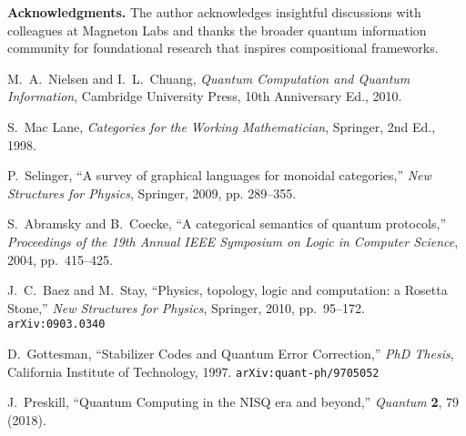 \documentclass[12pt]{article}
\begin{document}
\vspace{1cm}

\noindent \textbf{Acknowledgments.} 
The author acknowledges insightful discussions with colleagues at Magneton Labs and thanks the broader quantum information community for foundational research that inspires compositional frameworks.

\vspace{0.5cm}

\begin{thebibliography}{99}

M.~A.~Nielsen and I.~L.~Chuang, 
\textit{Quantum Computation and Quantum Information}, 
Cambridge University Press, 10th Anniversary Ed., 2010.

S.~Mac Lane, 
\textit{Categories for the Working Mathematician}, 
Springer, 2nd Ed., 1998.

P.~Selinger, 
``A survey of graphical languages for monoidal categories,''
\textit{New Structures for Physics}, Springer, 2009, pp. 289--355.

S.~Abramsky and B.~Coecke, 
``A categorical semantics of quantum protocols,''
\textit{Proceedings of the 19th Annual IEEE Symposium on Logic in Computer Science}, 2004, pp.~415--425.

J.~C.~Baez and M.~Stay, 
``Physics, topology, logic and computation: a Rosetta Stone,''
\textit{New Structures for Physics}, Springer, 2010, pp.~95--172. \\
\texttt{arXiv:0903.0340}

D.~Gottesman,
``Stabilizer Codes and Quantum Error Correction,''
\textit{PhD Thesis}, California Institute of Technology, 1997. 
\texttt{arXiv:quant-ph/9705052}

J.~Preskill,
``Quantum Computing in the NISQ era and beyond,''
\textit{Quantum} \textbf{2}, 79 (2018).

\end{thebibliography}
\end{document}
